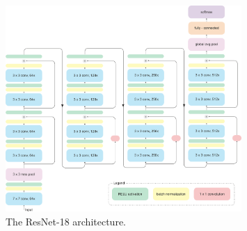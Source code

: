 \begin{figure}[h]
    \centering
    \includegraphics[width=0.8\textwidth]{images/resnet18.png}
    \caption{The ResNet-18 architecture.}
    \label{img:resnet18}
\end{figure}

